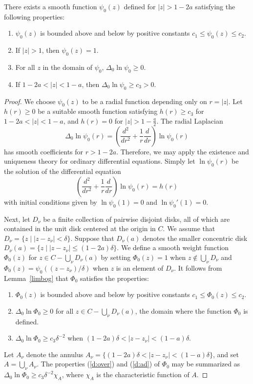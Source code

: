 \documentclass[mlq,fleqn]{w-art}
\newcommand{\lemref}[1]{Lemma~\ref{#1}}
\newcommand{\envert}[1]{\left\lvert#1\right\rvert}
\let\abs=\envert
\begin{document}
\begin{lem}\label{limbog} There exists a smooth function $\psi_0(z)$
defined for $\abs{z}>1-2a$ satisfying the following properties\textup{:}
\begin{enumerate}
\renewcommand{\labelenumi}{(\roman{enumi})}
\item $\psi_0(z)$ is bounded above and below by positive constants
$c_1\leq \psi_0(z)\leq c_2$.
\item If $\abs{z}>1$, then $\psi_0(z)=1$.
\item For all $z$ in the domain of $\psi_0$, $\Delta_0\ln \psi_0\geq 0$.
\item If $1-2a<\abs{z}<1-a$, then $\Delta_0\ln \psi_0\geq
c_3>0$.
\end{enumerate}
\end{lem}

\begin{proof}
We choose $\psi_0(z)$ to be a radial function depending only on $r=\abs{z}$.
Let $h(r)\geq 0$ be a suitable smooth function satisfying $h(r)\geq c_3$
for $1-2a<\abs{z}<1-a$, and $h(r)=0$ for $\abs{z}>1-\tfrac a2$. The radial
Laplacian
\[\Delta_0\ln\psi_0(r)=\left(\frac {d^2}{dr^2}+\frac
1r\frac d{dr}\right)\ln\psi_0(r)\]
has smooth coefficients for $r>1-2a$. Therefore, we may
apply the existence and uniqueness theory for ordinary differential
equations. Simply let $\ln \psi_0(r)$ be the solution of the differential
equation
\[\left(\frac{d^2}{dr^2}+\frac 1r\frac d{dr}\right)\ln \psi_0(r)=h(r)\]
with initial conditions given by $\ln \psi_0(1)=0$ and
$\ln\psi_0'(1)=0$.

Next, let $D_\nu$ be a finite collection of pairwise disjoint disks,
all of which are contained in the unit disk centered at the origin in
$C$. We assume that $D_\nu=\{z\mid \abs{z-z_\nu}<\delta\}$. Suppose that
$D_\nu(a)$ denotes the smaller concentric disk $D_\nu(a)=\{z\mid
\abs{z-z_\nu}\leq (1-2a)\delta\}$. We define a smooth weight function
$\Phi_0(z)$ for $z\in C-\bigcup_\nu D_\nu(a)$ by setting $\Phi_
0(z)=1$ when $z\notin \bigcup_\nu D_\nu$ and $\Phi_
0(z)=\psi_0((z-z_\nu)/\delta)$ when $z$ is an element of $D_\nu$. It
follows from \lemref{limbog} that $\Phi_ 0$ satisfies the properties:
\begin{enumerate}
\renewcommand{\labelenumi}{(\roman{enumi})}
\item \label{boundab}$\Phi_ 0(z)$ is bounded above and below by
positive constants $c_1\leq \Phi_ 0(z)\leq c_2$.
\item \label{d:over}$\Delta_0\ln\Phi_ 0\geq 0$ for all
$z\in C-\bigcup_\nu D_\nu(a)$,
the domain where the function $\Phi_ 0$ is defined.
\item \label{d:ad}$\Delta_0\ln\Phi_ 0\geq c_3\delta^{-2}$
when $(1-2a)\delta<\abs{z-z_\nu}<(1-a)\delta$.
\end{enumerate}
Let $A_\nu$ denote the annulus $A_\nu=\{(1-2a)\delta<\abs{z-z_\nu}<(1-a)
\delta \}$, and set $A=\bigcup_\nu A_\nu$. The
properties (\ref{d:over}) and (\ref{d:ad}) of $\Phi_ 0$
may be summarized as $\Delta_0\ln \Phi_ 0\geq c_3\delta^{-2}\chi_A$,
where $\chi _A$ is the characteristic function of $A$.
\end{proof}
\end{document}
